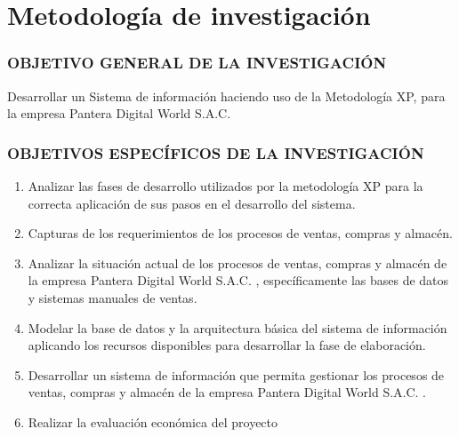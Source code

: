 \documentclass[12pt,a4paper]{article}
\newcommand{\newsection}[1]{\section{\hspace{4mm} #1}}%
\newcommand{\empresa}{Pantera Digital World S.A.C. }
\begin{document}
\newpage
\newsection{Metodología de investigación }
\subsubsection*{OBJETIVO GENERAL DE LA INVESTIGACIÓN}
Desarrollar un Sistema de información haciendo uso de la Metodología XP, para la empresa \empresa
\subsubsection*{OBJETIVOS ESPECÍFICOS DE LA INVESTIGACIÓN}
\begin{enumerate}
    \item Analizar las fases de desarrollo utilizados por la metodología XP para la correcta aplicación de sus pasos en el desarrollo del sistema.
    \item Capturas de los requerimientos de los procesos de ventas, compras y almacén.
    \item Analizar la situación actual de los procesos de ventas, compras y almacén de la empresa \empresa, específicamente las bases de datos y sistemas manuales de ventas.
    \item Modelar la base de datos y la arquitectura básica del sistema de información aplicando los recursos disponibles para desarrollar la fase de elaboración.
    \item Desarrollar un sistema de información que permita gestionar los procesos de ventas, compras y almacén de la empresa \empresa.
    \item Realizar la evaluación económica del proyecto
\end{enumerate}
\end{document}
